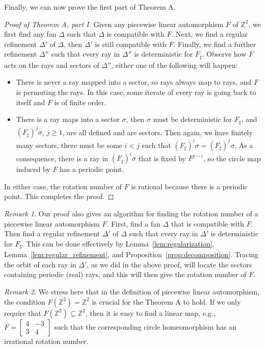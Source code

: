 \documentclass[11pt]{amsart}
\theoremstyle{definition}
\theoremstyle{plain}
\theoremstyle{remark}
\newtheorem{rem}{Remark}
\numberwithin{equation}{section}
\def\Z{\mathbb{Z}}
\def\fan{\Delta}
\begin{document}
Finally, we can now prove the first part of Theorem A.

\begin{proof}[Proof of Theorem A, part I]
Given any piecewise linear automorphism $F$ of $\Z^2$,
we first find any fan $\fan$ such that $\fan$ is compatible
with $F$. Next, we find a regular refinement $\fan'$ of $\fan$, then $\fan'$ is still compatible with $F$.
Finally, we find a further refinement $\fan''$ such that every ray in $\fan''$
is deterministic for $F_\sharp$. Observe how $F$ acts
on the rays and sectors of $\fan''$, either one of the following will happen:

\begin{itemize}
\item There is never a ray mapped into a sector, so rays always map to rays, and $F$ is permuting the rays. In this case, some iterate of every ray is going back to itself and $F$ is of finite order.

\item There is a ray maps into a sector $\sigma$, then $\sigma$ must be deterministic for $F_\sharp$, and $(F_\sharp)^j \sigma$, $j\ge 1$, 
are all defined and are sectors. Then again, we have finitely many sectors, there must be some $i<j$ such that
$(F_\sharp)^i \sigma=(F_\sharp)^j \sigma$. As a consequence, there is a ray in $(F_\sharp)^i \sigma$ that is fixed by $F^{j-i}$,
so the circle map induced by $F$ has a periodic point.
\end{itemize}

In either case, the rotation number of $F$ is rational because there is a periodic point.
This completes the proof.
\end{proof}

\begin{rem}
Our proof also gives an algorithm for finding the rotation number of a piecewise linear automorphism $F$. First, find a fan $\fan$ that is compatible with $F$. Then find a regular refinement $\fan'$ of $\Delta$ such that every ray in $\fan'$ is deterministic for $F_\sharp$. This can be done effectively by
Lemma~\ref{lem:regularization}, Lemma~\ref{lem:regular_refinement}, and Proposition~\ref{prop:decomposition}.  Tracing the orbit of each ray in $\Delta'$, as we did in the above proof, will locate the sectors containing periodic (real) rays, and this will then give the rotation number of $F$.
\end{rem}

\begin{rem}
We stress here that in the definition of piecewise linear automorphism,
the condition $F(\Z^2)=\Z^2$ is crucial for the Theorem A to hold. If we only require that $F(\Z^2)\subseteq\Z^2$,
then it is easy to find a linear map, e.g.,
$F=\left[\begin{smallmatrix} 4 & -3 \\ 3 & 4 \end{smallmatrix}\right]$
such that the corresponding circle homeomorphism has an irrational rotation number.
\end{rem}
\end{document}
